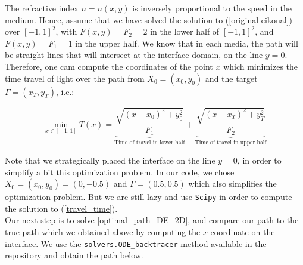 \documentclass[11pt]{article}
\theoremstyle{definition}
\theoremstyle{remark}
\begin{document}
\begin{center}
\end{center}

\noindent The refractive index $n=n(x,y)$ is inversely proportional to the speed in the medium. Hence, assume that we have solved the solution to (\ref{original-eikonal}) over $[-1,1]^2$, with $F(x,y)=F_2 =2$ in the lower half of $[-1,1]^2$, and $F(x,y)=F_1 = 1$ in the upper half. We know that in each media, the path will be straight lines that will intersect at the interface domain, on the line $y=0$. Therefore, one cam compute the coordinates of the point $x$ which minimizes the time travel of light over the path from $X_0=(x_0,y_0)$ and the target $\Gamma=(x_T,y_T)$, i.e.:

\begin{equation}
\label{travel_time}
    \min_{x\in[-1,1]}T(x)=\underbrace{\frac{\sqrt{(x-x_0)^2+y_0^2}}{F_1}}_{\text{Time of travel in lower half}}+\underbrace{\frac{\sqrt{(x-x_T)^2+y_T^2}}{F_2}}_{\text{Time of travel in upper half}}
\end{equation}

\noindent Note that we strategically placed the interface on the line $y=0$, in order to simplify a bit this optimization problem. In our code, we chose $X_0=(x_0,y_0)=(0,-0.5)$ and $\Gamma =(0.5,0.5)$ which also simplifies the optimization problem. But we are still lazy and use \texttt{Scipy} in order to compute the solution to (\ref{travel_time}). \\
\noindent Our next step is to solve \ref{optimal_path_DE_2D}, and compare our path to the true path which we obtained above by computing the $x$-coordinate on the interface. We use the \texttt{solvers.ODE\_backtracer} method available in the repository and obtain the path below.
\end{document}
